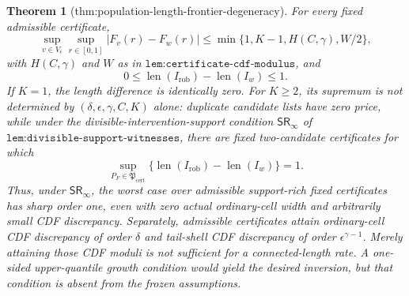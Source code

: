 \documentclass{article}
\newtheorem{theorem}{Theorem}
\begin{document}
\begin{theorem}[thm:population-length-frontier-degeneracy]\label{thm:population-length-frontier-degeneracy}
For every fixed admissible certificate,
\[
\sup_{v\in V_\epsilon}\sup_{r\in[0,1]}|F_v(r)-F_w(r)|
\le\min\{1,K-1,H(C,\gamma),W/2\},
\]
with \(H(C,\gamma)\) and \(W\) as in \(\texttt{lem:certificate-cdf-modulus}\), and
\[
0\le\operatorname{len}(I_{\mathrm{rob}})
      -\operatorname{len}(I_w)\le1.
\]
If \(K=1\), the length difference is identically zero. For \(K\ge2\), its supremum is not determined by \((\delta,\epsilon,\gamma,C,K)\) alone: duplicate candidate lists have zero price, while under the divisible-intervention-support condition \(\mathsf{SR}_\infty\) of \(\texttt{lem:divisible-support-witnesses}\), there are fixed two-candidate certificates for which
\[
\sup_{P_F\in\mathfrak P_{\mathrm{cert}}}
\{\operatorname{len}(I_{\mathrm{rob}})
-\operatorname{len}(I_w)\}=1.
\]
Thus, under \(\mathsf{SR}_\infty\), the worst case over admissible support-rich fixed certificates has sharp order one, even with zero actual ordinary-cell width and arbitrarily small CDF discrepancy. Separately, admissible certificates attain ordinary-cell CDF discrepancy of order \(\delta\) and tail-shell CDF discrepancy of order \(\epsilon^{\gamma-1}\). Merely attaining those CDF moduli is not sufficient for a connected-length rate. A one-sided upper-quantile growth condition would yield the desired inversion, but that condition is absent from the frozen assumptions.
\end{theorem}
\end{document}
